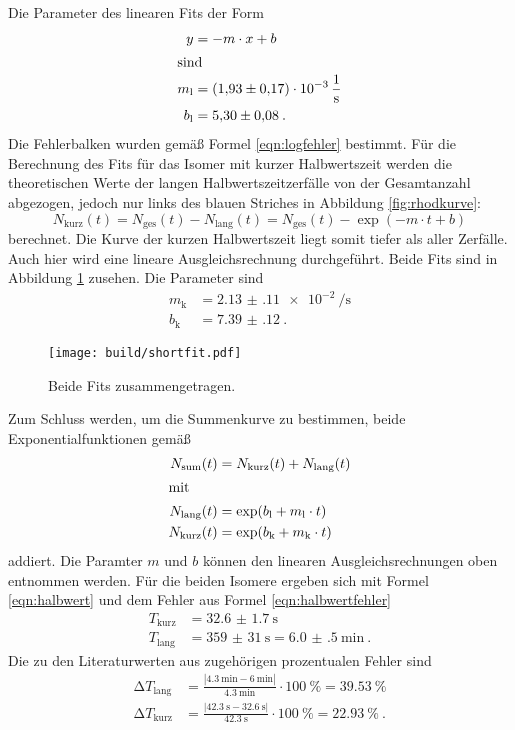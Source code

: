 Die Parameter des linearen Fits der Form
\begin{align}
    y &= -m\cdot x + b\\
    \shortintertext{sind}
    m_\text{l} &= \SI{1.93(17)e-3}{\per\second}\\
    b_\text{l} &= \num{5.30(8)}\:.
\end{align}
Die Fehlerbalken wurden gemäß Formel \eqref{eqn:logfehler} bestimmt.
Für die Berechnung des Fits für das Isomer mit kurzer Halbwertszeit werden die
theoretischen Werte der langen Halbwertszeitzerfälle von der Gesamtanzahl abgezogen,
jedoch nur links des blauen Striches in Abbildung \ref{fig:rhodkurve}:
\begin{equation}
    N_\text{kurz}(t) = N_\text{ges}(t) - N_\text{lang}(t)
     = N_\text{ges}(t) - \exp(-m\cdot t + b)
\end{equation}
berechnet.
Die Kurve der kurzen Halbwertszeit liegt somit tiefer als aller Zerfälle.
Auch hier wird eine lineare Ausgleichsrechnung durchgeführt. Beide Fits sind in
Abbildung \ref{fig:rhfitl} zusehen. Die Parameter sind
\begin{align}
    m_\text{k} &= \SI{2.13(11)e-2}{\per\second}\\
    b_\text{k} &= \num{7.39(12)}\:.
\end{align}

\begin{figure}
    \centering
    \texttt{[image: build/shortfit.pdf]}
    \caption{Beide Fits zusammengetragen.}
    \label{fig:rhfitl}
\end{figure}

Zum Schluss werden, um die Summenkurve zu bestimmen, beide Exponentialfunktionen
gemäß
\begin{align}
  N_\text{sum}(t) &= N_\text{kurz}(t) + N_\text{lang}(t) \\
\shortintertext{mit}
  N_\text{lang}(t) &= \exp(b_\text{l} + m_\text{l} \cdot t) \\
  N_\text{kurz}(t) &= \exp(b_\text{k} + m_\text{k} \cdot t)
\end{align}
addiert.
Die Paramter $m$ und $b$ können den linearen Ausgleichsrechnungen oben entnommen werden.
Für die beiden Isomere ergeben sich mit Formel \eqref{eqn:halbwert} und dem Fehler
aus Formel \eqref{eqn:halbwertfehler}
\begin{align*}
  T_\text{kurz} &= \SI{32.6(17)}{\second} \\
  T_\text{lang} &= \SI{359(31)}{\second} = \SI{6.0(5)}{\minute} \:.
\end{align*}
Die zu den Literaturwerten aus \cite{litRh} zugehörigen prozentualen Fehler sind
\begin{align*}
  \increment T_\text{lang} &= \frac{|\SI{4.3}{\minute} - \SI{6}{\minute}|}{\SI{4.3}{\minute}}\cdot\SI{100}{\percent}
  = \SI{39.53}{\percent}\\
  \increment T_\text{kurz} &= \frac{|\SI{42.3}{\second} - \SI{32.6}{\second}|}{\SI{42.3}{\second}}\cdot\SI{100}{\percent}
  = \SI{22.93}{\percent}\:.
\end{align*}
